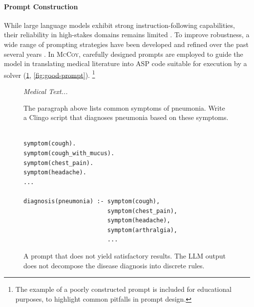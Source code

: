 \documentclass[11pt,leqno]{amsart}
\newenvironment{commandline}{
	\medskip
	\begin{mdframed}[style=commandline]
}{
	\end{mdframed}
	\medskip
}
\newenvironment{prompt}[1][Prompt:]{ %
	\medskip
	\begin{mdframed}[style=warning]
		\noindent{\textbf{#1}}
}{
	\end{mdframed}
}
\newcommand{\sys}{\textsc{McCoy}\xspace}
\begin{document}
\paragraph{\textbf{Prompt Construction}}
While large language models exhibit strong instruction-following capabilities, 
their reliability in high-stakes domains remains limited \cite{bowman2023things}. 
To improve robustness, a wide range of prompting strategies have been developed 
and refined over the past several years \cite{liu2021pretrain, promptingguidePromptEngineering}. 
In \sys, carefully designed prompts are employed to guide the model in translating medical literature 
into ASP code suitable for execution by a solver (\cref{fig:bad-prompt}, \cref{fig:good-prompt}).
\footnote{The example of a poorly constructed prompt is included for educational purposes, to highlight common pitfalls in prompt design.}

\begin{figure}[!h]
\centering
\begin{prompt}
\textit{Medical Text...}

The paragraph above lists common symptoms of pneumonia.
Write a Clingo script that diagnoses pneumonia based on these symptoms.
\end{prompt}

\begin{commandline}
\footnotesize
\begin{verbatim}

symptom(cough).
symptom(cough_with_mucus).
symptom(chest_pain).
symptom(headache).
...

diagnosis(pneumonia) :- symptom(cough), 
                        symptom(chest_pain), 
                        symptom(headache), 
                        symptom(arthralgia),
                        ...
\end{verbatim}
\end{commandline}

\caption{A prompt that does not yield satisfactory results. The LLM output does not decompose the disease diagnosis into discrete rules.}
\label{fig:bad-prompt}
\end{figure}
\end{document}

